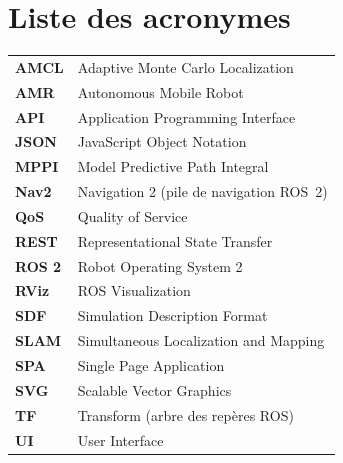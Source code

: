 \chapter*{Liste des acronymes}
\begin{tabular}{@{}p{3cm}l@{}}
  \textbf{AMCL}   & Adaptive Monte Carlo Localization \\[0.3em]
  \textbf{AMR}    & Autonomous Mobile Robot \\[0.3em]
  \textbf{API}    & Application Programming Interface \\[0.3em]
  \textbf{JSON}   & JavaScript Object Notation \\[0.3em]
  \textbf{MPPI}   & Model Predictive Path Integral \\[0.3em]
  \textbf{Nav2}   & Navigation 2 (pile de navigation ROS~2) \\[0.3em]
  \textbf{QoS}    & Quality of Service \\[0.3em]
  \textbf{REST}   & Representational State Transfer \\[0.3em]
  \textbf{ROS 2}  & Robot Operating System 2 \\[0.3em]
  \textbf{RViz}   & ROS Visualization \\[0.3em]
  \textbf{SDF}    & Simulation Description Format \\[0.3em]
  \textbf{SLAM}   & Simultaneous Localization and Mapping \\[0.3em]
  \textbf{SPA}    & Single Page Application \\[0.3em]
  \textbf{SVG}    & Scalable Vector Graphics \\[0.3em]
  \textbf{TF}     & Transform (arbre des repères ROS) \\[0.3em]
  \textbf{UI}     & User Interface \\[0.3em]
\end{tabular}

\cleardoublepage
